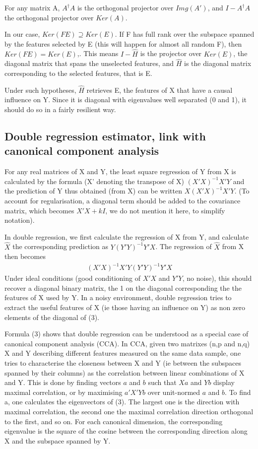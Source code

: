 \documentclass{article}
\begin{document}
For any matrix A, $A^\dagger A$ is the orthogonal projector over $Img(A')$, and $I-A^\dagger A$ the orthogonal projector over $Ker(A)$. 

In our case, $Ker(FE)\supseteq Ker(E)$. If F has full rank over the subspace spanned by the features selected by E (this will happen for almost all random F), then $Ker(FE) = Ker(E)$,. This means $I - \hat H$ is the projector over $Ker(E)$, the diagonal matrix that spans the unselected features, and $\hat H$ is the diagonal matrix corresponding to the selected features, that is E.

Under such hypotheses, $\hat H$ retrieves E, the features of X that have a causal influence on Y. Since it is diagonal with eigenvalues well separated (0 and 1), it should do so in a fairly resilient way.

\subsection{Double regression estimator, link with canonical component analysis}

For any real matrices of X and Y, the least square regression of Y from X is calculated by the formula (X' denoting the transpose of X) $(X'X)^{-1} X'Y$ and the prediction of Y thus obtained (from X) can be written $X(X'X)^{-1} X'Y$. (To account for regularisation, a diagonal term should be added to the covariance matrix, which becomes $X'X+kI$, we do not mention it here, to simplify notation).
 
In double regression, we first calculate the regression of X from Y, and calculate $\hat X$ the corresponding prediction as $Y(Y'Y)^{-1} Y'X$. The regression of $\hat X$ from X then becomes
\begin{equation}
\begin{aligned}
(X'X)^{-1} X'Y(Y'Y)^{-1} Y'X
\end{aligned}
\end{equation}
Under ideal conditions (good conditioning of $X'X$ and $Y'Y$, no noise), this should recover a diagonal binary matrix, the 1 on the diagonal corresponding the the features of X used by Y. In a noisy environment, double regression tries to extract the useful features of X (ie those having an influence on Y) as non zero elements of the diagonal of (3).

Formula (3) shows that double regression can be understood as a special case of canonical component analysis (CCA). In CCA, given two matrixes (n,p and n,q) X and Y describing different features measured on the same data sample, one tries to characterise the closeness between X and Y (ie between the subspaces spanned by their columns) as the correlation between linear combinations of X and Y. This is done by finding vectors $a$ and $b$ such that $Xa$ and $Yb$ display maximal correlation, or by maximising $a'X'Yb$ over unit-normed $a$ and $b$. To find a, one calculates the eigenvectors of (3). The largest one is the direction with maximal correlation, the second one the maximal correlation direction orthogonal to the first, and so on. For each canonical dimension, the corresponding eigenvalue is the square of the cosine between the corresponding direction along X and the subspace spanned by Y.  
\end{document}
